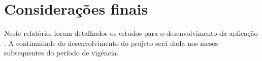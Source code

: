 \chapter{Considerações finais} \label{sec:conclusao}
Neste relatório, foram detalhados os estudos para o desenvolvimento da aplicação \crossword. A continuidade do desenvolvimento do projeto será dada nos meses subsequentes do período de vigência.